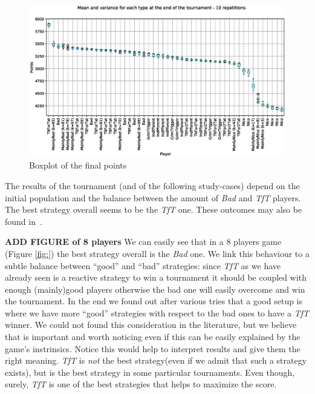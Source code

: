 \documentclass[journal,a4paper,10pt,twoside]{IEEEtran} %
\begin{document}
\begin{figure}[!ht]
    \centering
    \includegraphics[width=1\columnwidth]{../img/ipdmp/ipdmp-boxplot-final-points-50}
    \caption{Boxplot of the final points}
    \label{fig:boxIPDMPfinal}
\end{figure}

The results of the tournament (and of the following study-cases) depend on the initial population and the balance between the amount of \textit{Bad} and \textit{TfT} players. The best strategy overall seems to be the \textit{TfT} one.
These outcomes may also be found in~\cite{mathieu2017}.

\textbf{ADD FIGURE of 8 players}
We can easily see that in a 8 players game (Figure \ref{fig:}) the best strategy overall is the \textit{Bad} one. We link this behaviour to a subtle balance between ``good'' and ``bad'' strategies: since \textit{TfT} as we have already seen is a reactive strategy to win a tournament it should be coupled with enough (mainly)good players otherwise the bad one will easily overcome and win the tournament. In the end we found out after various tries that a good setup is where we have more ``good'' strategies with respect to the bad ones to have a \textit{TfT} winner. We could not found this consideration in the literature, but we believe that is important and worth noticing even if this can be easily explained by the game's instrinsics. Notice this would help to interpret results and give them the right meaning. \textit{TfT} is \textit{not} the best strategy(even if we admit that such a strategy exists), but is the best strategy in some particular tournaments. Even though, surely, \textit{TfT} is one of the best strategies that helps to maximize the score.
\end{document}
